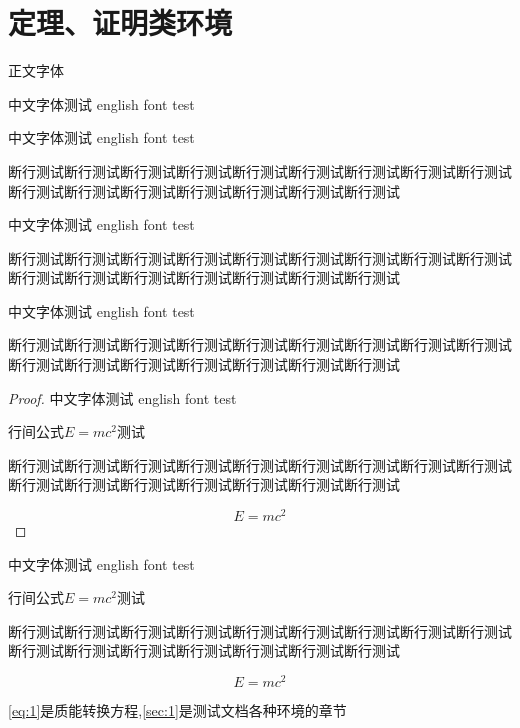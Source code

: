 
\section{定理、证明类环境}\label{sec:1}
正文字体\par
中文字体测试 english font test
\begin{definition}
中文字体测试 english font test\par
断行测试断行测试断行测试断行测试断行测试断行测试断行测试断行测试断行测试断行测试断行测试断行测试断行测试断行测试断行测试断行测试\par
\end{definition}

\begin{theorem}
中文字体测试 english font test\par
断行测试断行测试断行测试断行测试断行测试断行测试断行测试断行测试断行测试断行测试断行测试断行测试断行测试断行测试断行测试断行测试\par
\end{theorem}

\begin{theorem}[勾股定理]
中文字体测试 english font test\par
断行测试断行测试断行测试断行测试断行测试断行测试断行测试断行测试断行测试断行测试断行测试断行测试断行测试断行测试断行测试断行测试\par

\begin{proof}
中文字体测试 english font test\par
行间公式$E=mc^2$测试\par
断行测试断行测试断行测试断行测试断行测试断行测试断行测试断行测试断行测试断行测试断行测试断行测试断行测试断行测试断行测试断行测试\par
\begin{equation}
	E=mc^2
\end{equation}
\end{proof}


\begin{solution}
中文字体测试 english font test\par
行间公式$E=mc^2$测试\par
断行测试断行测试断行测试断行测试断行测试断行测试断行测试断行测试断行测试断行测试断行测试断行测试断行测试断行测试断行测试断行测试\par
\begin{equation}
\label{eq:1}
	E=mc^2
\end{equation}
\end{solution}


\autoref{eq:1}是质能转换方程,\autoref{sec:1}是测试文档各种环境的章节
\end{theorem}




